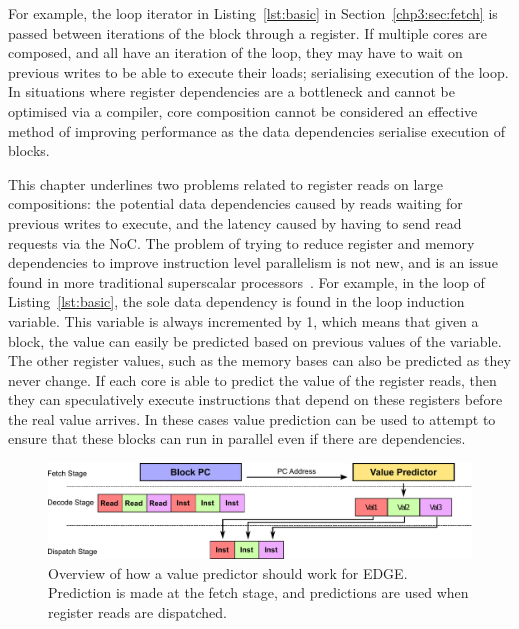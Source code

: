 For example, the loop iterator in Listing~\ref{lst:basic} in Section~\ref{chp3:sec:fetch} is passed between iterations of the block through a register.
If multiple cores are composed, and all have an iteration of the loop, they may have to wait on previous writes to be able to execute their loads; serialising execution of the loop.
In situations where register dependencies are a bottleneck and cannot be optimised via a compiler, core composition cannot be considered an effective method of improving performance as the data dependencies serialise execution of blocks.

This chapter underlines two problems related to register reads on large compositions: the potential data dependencies caused by reads waiting for previous writes to execute, and the latency caused by having to send read requests via the NoC.
The problem of trying to reduce register and memory dependencies to improve instruction level parallelism is not new, and is an issue found in more traditional superscalar processors~\cite{peraisVTAGE2014}.
For example, in the loop of Listing~\ref{lst:basic}, the sole data dependency is found in the loop induction variable.
This variable is always incremented by 1, which means that given a block, the value can easily be predicted based on previous values of the variable.
The other register values, such as the memory bases can also be predicted as they never change.
If each core is able to predict the value of the register reads, then they can speculatively execute instructions that depend on these registers before the real value arrives.
In these cases value prediction can be used to attempt to ensure that these blocks can run in parallel even if there are dependencies.

\begin{figure}[t]
    \centering
    \includegraphics[width=1\textwidth]{chapter3/graphics/val_pred_overview.pdf}
    \caption{Overview of how a value predictor should work for EDGE. Prediction is made at the fetch stage, and predictions are used when register reads are dispatched.}
    \label{fig:bad_overview}
\vspace{1em}
\end{figure}

